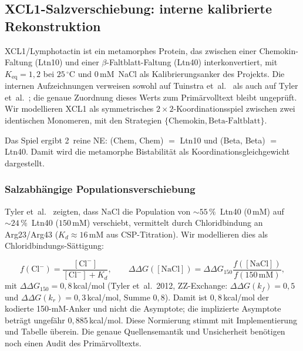 \documentclass[12pt,a4paper]{article}
\begin{document}
\subsection{XCL1-Salzverschiebung: interne kalibrierte Rekonstruktion}
\label{sec:xcl1}

XCL1/Lymphotactin ist ein metamorphes Protein, das zwischen einer
Chemokin-Faltung (Ltn10) und einer $\beta$-Faltblatt-Faltung (Ltn40)
interkonvertiert, mit $K_\text{eq} = 1{,}2$ bei $25\,{}^\circ\text{C}$ und
$0$\,mM~NaCl als Kalibrierungsanker des Projekts. Die internen
Aufzeichnungen verweisen sowohl auf Tuinstra et~al.~\cite{Tuinstra2008}
als auch auf Tyler et~al.~\cite{Tyler2012}; die genaue Zuordnung dieses
Werts zum Primärvolltext bleibt ungeprüft. Wir modellieren XCL1 als symmetrisches
$2\times 2$-Koordinationsspiel zwischen zwei identischen Monomeren, mit
den Strategien $\{\text{Chemokin}, \text{Beta-Faltblatt}\}$.

Das Spiel ergibt 2~reine NE: (Chem, Chem) $=$ Ltn10 und
(Beta, Beta) $=$ Ltn40. Damit wird die metamorphe Bistabilität als
Koordinationsgleichgewicht dargestellt.

\subsubsection{Salzabhängige Populationsverschiebung}

Tyler et~al.~\cite{Tyler2012} zeigten, dass NaCl die Population von
${\sim}55\,\%$~Ltn40 ($0$\,mM) auf ${\sim}24\,\%$~Ltn40 ($150$\,mM)
verschiebt, vermittelt durch Chloridbindung an Arg23/Arg43
($K_d \approx 16$\,mM aus CSP-Titration). Wir modellieren dies als
Chloridbindungs-Sättigung:

\begin{equation}
  f(\text{Cl}^-) = \frac{[\text{Cl}^-]}{[\text{Cl}^-] + K_d}, \qquad
  \Delta\Delta G([\text{NaCl}])
  = \Delta\Delta G_{150}
    \frac{f([\text{NaCl}])}{f(150\,\text{mM})},
  \label{eq:salt_model}
\end{equation}
mit $\Delta\Delta G_{150} = 0{,}8$\,kcal/mol (Tyler et~al.\ 2012,
ZZ-Exchange: $\Delta\Delta G(k_f)=0{,}5$ und $\Delta\Delta G(k_r)=0{,}3$\,kcal/mol,
Summe $0{,}8$).
Damit ist $0{,}8$\,kcal/mol der kodierte 150-mM-Anker und nicht die
Asymptote; die implizierte Asymptote beträgt ungefähr
$0{,}885$\,kcal/mol. Diese Normierung stimmt mit Implementierung und
Tabelle überein. Die genaue Quellensemantik und Unsicherheit benötigen
noch einen Audit des Primärvolltexts.
\end{document}
